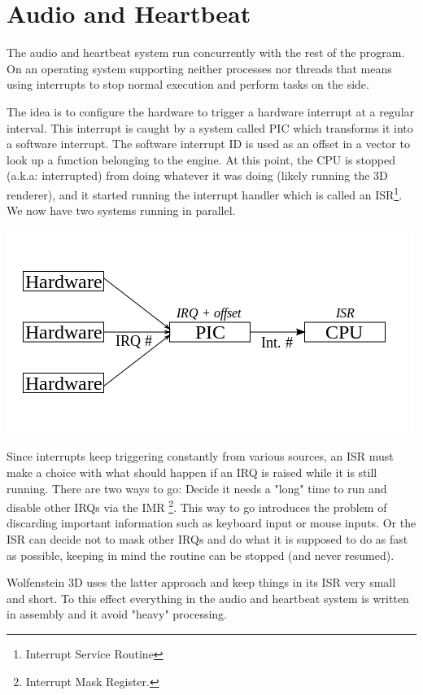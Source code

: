 \section{Audio and Heartbeat}
The audio and heartbeat system run concurrently with the rest of the program. On an operating system supporting neither processes nor threads that means using interrupts to stop normal execution and perform tasks on the side.\\
\par
The idea is to configure the hardware to trigger a hardware interrupt at a regular interval. This interrupt is caught by a system called PIC which transforms it into a software interrupt. The software interrupt ID is used as an offset in a vector to look up a function belonging to the engine. At this point, the CPU is stopped (a.k.a: interrupted) from doing whatever it was doing (likely running the 3D renderer), and it started running the interrupt handler which is called an ISR\footnote{Interrupt Service Routine}. We now have two systems running in parallel.

\includegraphics[width=.9\textwidth]{imgs/drawings/irqs/explanation.png}
\par
 Since interrupts keep triggering constantly from various sources, an ISR must make a choice with what should happen if an IRQ is raised while it is still running. There are two ways to go: Decide it needs a "long" time to run and disable other IRQs via the IMR \footnote{Interrupt Mask Register.}. This way to go introduces the problem of discarding important information such as keyboard input or mouse inputs. Or the ISR can decide not to mask other IRQs and do what it is supposed to do as fast as possible, keeping in mind the routine can be stopped (and never resumed).\\
 \par
 Wolfenstein 3D uses the latter approach and keep things in its ISR very small and short. To this effect everything in the audio and heartbeat system is written in assembly and it avoid "heavy" processing.

